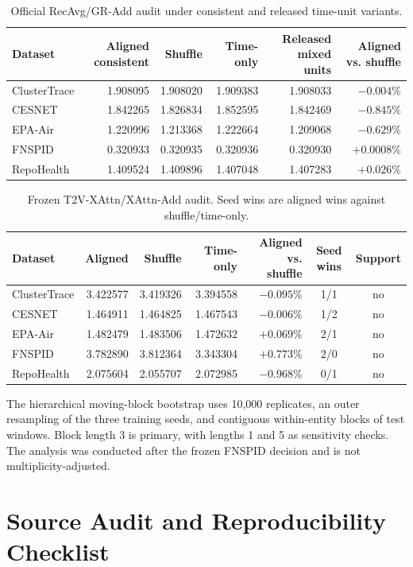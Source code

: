 \begin{table}[!htbp]
\caption{Official RecAvg/GR-Add audit under consistent and released time-unit variants.}
\label{tab:recavg}
\centering
\small
\begin{tabular}{lrrrrr}
\toprule
Dataset & Aligned consistent & Shuffle & Time-only & Released mixed units & Aligned vs. shuffle \\
\midrule
ClusterTrace & 1.908095 & 1.908020 & 1.909383 & 1.908033 & $-0.004\%$ \\
CESNET & 1.842265 & 1.826834 & 1.852595 & 1.842469 & $-0.845\%$ \\
EPA-Air & 1.220996 & 1.213368 & 1.222664 & 1.209068 & $-0.629\%$ \\
FNSPID & 0.320933 & 0.320935 & 0.320936 & 0.320930 & $+0.0008\%$ \\
RepoHealth & 1.409524 & 1.409896 & 1.407048 & 1.407283 & $+0.026\%$ \\
\bottomrule
\end{tabular}
\end{table}

\begin{table}[!htbp]
\caption{Frozen T2V-XAttn/XAttn-Add audit. Seed wins are aligned wins against shuffle/time-only.}
\label{tab:xattn}
\centering
\small
\begin{tabular}{lrrrrcc}
\toprule
Dataset & Aligned & Shuffle & Time-only & Aligned vs. shuffle & Seed wins & Support \\
\midrule
ClusterTrace & 3.422577 & 3.419326 & 3.394558 & $-0.095\%$ & 1/1 & no \\
CESNET & 1.464911 & 1.464825 & 1.467543 & $-0.006\%$ & 1/2 & no \\
EPA-Air & 1.482479 & 1.483506 & 1.472632 & $+0.069\%$ & 2/1 & no \\
FNSPID & 3.782890 & 3.812364 & 3.343304 & $+0.773\%$ & 2/0 & no \\
RepoHealth & 2.075604 & 2.055707 & 2.072985 & $-0.968\%$ & 0/1 & no \\
\bottomrule
\end{tabular}
\end{table}

The hierarchical moving-block bootstrap uses 10,000 replicates, an outer resampling of the three training seeds, and contiguous within-entity blocks of test windows. Block length 3 is primary, with lengths 1 and 5 as sensitivity checks. The analysis was conducted after the frozen FNSPID decision and is not multiplicity-adjusted.

\section{Source Audit and Reproducibility Checklist}
\label{app:repro}


